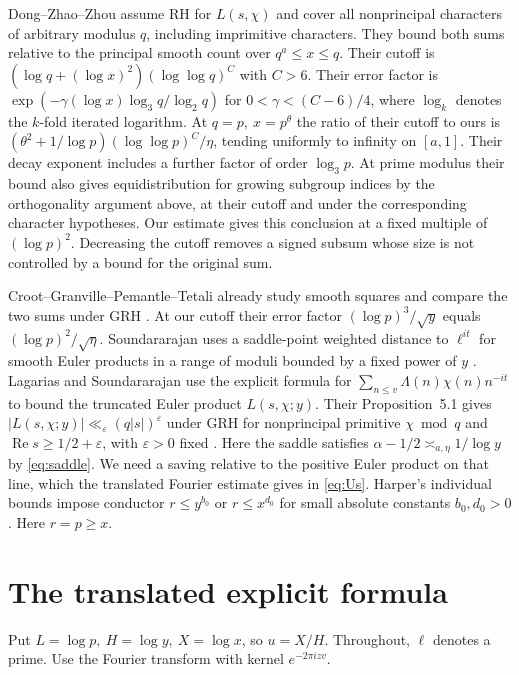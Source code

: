 \documentclass[11pt]{article}
\newcommand{\re}{\operatorname{Re}}
\begin{document}
Dong--Zhao--Zhou \cite[Theorem 1.4, v1]{dzz} assume RH for
\(L(s,\chi)\) and cover all nonprincipal characters of arbitrary
modulus \(q\), including imprimitive characters. They bound both
sums relative to the principal smooth count over \(q^a\le x\le q\).
Their cutoff is \((\log q+(\log x)^2)(\log\log q)^C\) with \(C>6\).
Their error factor is
\(\exp(-\gamma(\log x)\log_3 q/\log_2 q)\) for \(0<\gamma<(C-6)/4\),
where \(\log_k\) denotes the \(k\)-fold iterated logarithm. At
\(q=p,\ x=p^\theta\) the ratio of their cutoff to ours is
\((\theta^2+1/\log p)(\log\log p)^C/\eta\), tending uniformly to
infinity on \([a,1]\). Their decay exponent includes a further factor
of order \(\log_3 p\). At prime modulus their bound also gives
equidistribution for growing subgroup indices by the orthogonality
argument above, at their cutoff and under the corresponding character
hypotheses. Our estimate gives this conclusion at a fixed multiple
of \((\log p)^2\). Decreasing the cutoff removes a signed subsum
whose size is not controlled by a bound for the original sum.

Croot--Granville--Pemantle--Tetali already study smooth squares and
compare the two sums under GRH \cite[\S7.3, Lemma 7]{cgpt}. At our
cutoff their error factor \((\log p)^3/\sqrt y\) equals
\((\log p)^2/\sqrt\eta\). Soundararajan uses a saddle-point weighted
distance to \(\ell^{it}\) for smooth Euler products in a range of moduli
bounded by a fixed power of \(y\) \cite[\S4]{sound}.
Lagarias and Soundararajan use the explicit formula for
\(\sum_{n\le v}\Lambda(n)\chi(n)n^{-it}\) to bound the truncated Euler
product \(L(s,\chi;y)\). Their Proposition~5.1 gives
\(|L(s,\chi;y)|\ll_\varepsilon(q|s|)^\varepsilon\) under GRH for
nonprincipal primitive \(\chi\bmod q\) and
\(\re s\ge1/2+\varepsilon\), with \(\varepsilon>0\) fixed
\cite[\S5]{ls}. Here the saddle satisfies
\(\alpha-1/2\asymp_{a,\eta}1/\log y\) by \eqref{eq:saddle}.
We need a saving relative to the positive Euler product on that line,
which the translated Fourier estimate gives in \eqref{eq:Us}.
Harper's individual
bounds impose conductor \(r\le y^{b_0}\) or \(r\le x^{d_0}\) for small
absolute constants \(b_0,d_0>0\) \cite[Theorem 3 and Proposition 1]{harper}.
Here \(r=p\ge x\).

\section{The translated explicit formula}
Put \(L=\log p,\ H=\log y,\ X=\log x\), so \(u=X/H\). Throughout,
\(\ell\) denotes a prime. Use the Fourier transform with kernel
\(e^{-2\pi i z v}\).
\end{document}
